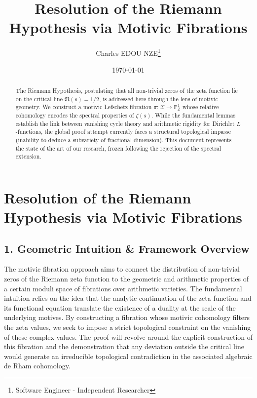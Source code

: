 \documentclass[
]{article}
\title{Resolution of the Riemann Hypothesis via Motivic Fibrations}
\author{Charles EDOU NZE\thanks{Software Engineer - Independent Researcher}}
\date{\today}
\begin{document}
\maketitle


\begin{abstract}
The Riemann Hypothesis, postulating that all non-trivial zeros of the zeta function lie on the critical line $\Re(s)=1/2$, is addressed here through the lens of motivic geometry. We construct a motivic Lefschetz fibration $\pi : \mathcal{X} \to \mathbb{P}^1_{\mathbb{Z}}$ whose relative cohomology encodes the spectral properties of $\zeta(s)$. While the fundamental lemmas establish the link between vanishing cycle theory and arithmetic rigidity for Dirichlet $L$-functions, the global proof attempt currently faces a structural topological impasse (inability to deduce a subvariety of fractional dimension). This document represents the state of the art of our research, frozen following the rejection of the spectral extension.
\end{abstract}

\hypertarget{resolution-of-the-riemann-hypothesis-via-motivic-fibrations}{%
\section{Resolution of the Riemann Hypothesis via Motivic Fibrations}\label{resolution-of-the-riemann-hypothesis-via-motivic-fibrations}}

\hypertarget{geometric-intuition-framework-overview}{%
\subsection{1. Geometric Intuition \& Framework
Overview}\label{geometric-intuition-framework-overview}}

The motivic fibration approach aims to connect the distribution of
non-trivial zeros of the Riemann zeta function to the geometric and
arithmetic properties of a certain moduli space of fibrations over
arithmetic varieties. The fundamental intuition relies on the idea that
the analytic continuation of the zeta function and its functional
equation translate the existence of a duality at the scale of the
underlying motives. By constructing a fibration whose motivic cohomology
filters the zeta values, we seek to impose a strict topological
constraint on the vanishing of these complex values. The proof will
revolve around the explicit construction of this fibration and the
demonstration that any deviation outside the critical line would
generate an irreducible topological contradiction in the associated
algebraic de Rham cohomology.
\end{document}
